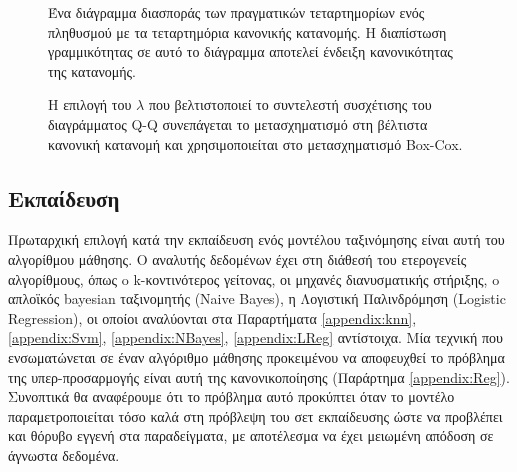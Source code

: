 	\begin{figure}[!htb]
		\begin{minipage}{0.45\textwidth}
	\caption[Διάγραμμα Quantile-Quantile]{Ένα διάγραμμα διασποράς των πραγματικών τεταρτημορίων ενός πληθυσμού με τα τεταρτημόρια κανονικής κατανομής. Η διαπίστωση γραμμικότητας σε αυτό το διάγραμμα αποτελεί ένδειξη κανονικότητας της κατανομής.}	
\end{minipage} \qquad
\begin{minipage}{0.45\textwidth}
	\caption[Επιλογή $\lambda$ Box-Cox μετασχηματισμού]{Η επιλογή του $\lambda$ που βελτιστοποιεί το συντελεστή συσχέτισης του διαγράμματος Q-Q συνεπάγεται το μετασχηματισμό στη βέλτιστα κανονική κατανομή και χρησιμοποιείται στο μετασχηματισμό Box-Cox.}

\end{minipage}
\end{figure}
	
\subsection{Εκπαίδευση}
Πρωταρχική επιλογή κατά την εκπαίδευση ενός μοντέλου ταξινόμησης είναι αυτή του αλγορίθμου μάθησης. Ο αναλυτής δεδομένων έχει στη διάθεσή του ετερογενείς αλγορίθμους, όπως o k-κοντινότερος γείτονας, οι μηχανές διανυσματικής στήριξης, o απλοϊκός bayesian ταξινομητής (Naive Bayes), η Λογιστική Παλινδρόμηση (Logistic Regression), οι οποίοι αναλύονται στα Παραρτήματα \ref{appendix:knn}, \ref{appendix:Svm}, \ref{appendix:NBayes}, \ref{appendix:LReg} αντίστοιχα. Μία τεχνική που ενσωματώνεται σε έναν αλγόριθμο μάθησης προκειμένου να αποφευχθεί το πρόβλημα της υπερ-προσαρμογής είναι αυτή της κανονικοποίησης (Παράρτημα \ref{appendix:Reg}). Συνοπτικά θα αναφέρουμε ότι το πρόβλημα αυτό προκύπτει όταν το μοντέλο παραμετροποιείται τόσο καλά στη πρόβλεψη του σετ εκπαίδευσης ώστε να προβλέπει και θόρυβο εγγενή στα παραδείγματα, με αποτέλεσμα να έχει μειωμένη απόδοση σε άγνωστα δεδομένα.

